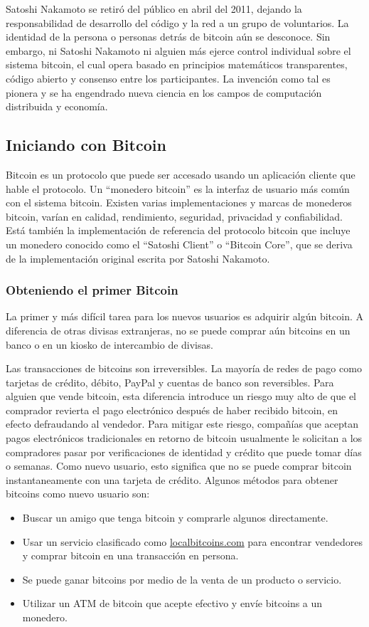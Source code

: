 \documentclass[10pt,journal,compsoc]{IEEEtran}
\begin{document}
Satoshi Nakamoto se retiró del público en abril del 2011, dejando la responsabilidad de desarrollo del código y la red a un grupo de voluntarios. La identidad de la persona o personas detrás de bitcoin aún se desconoce. Sin embargo, ni Satoshi Nakamoto ni alguien más ejerce control individual sobre el sistema bitcoin, el cual opera basado en principios matemáticos transparentes, código abierto y consenso entre los participantes. La invención como tal es pionera y se ha engendrado nueva ciencia en los campos de computación distribuida y economía. 

\subsection{Iniciando con Bitcoin}
Bitcoin es un protocolo que puede ser accesado usando un aplicación cliente que hable el protocolo. Un ``monedero bitcoin'' es la interfaz de usuario más común con el sistema bitcoin. Existen varias implementaciones y marcas de monederos bitcoin, varían en calidad, rendimiento, seguridad, privacidad y confiabilidad. Está también la implementación de referencia del protocolo bitcoin que incluye un monedero conocido como el ``Satoshi Client'' o ``Bitcoin Core'', que se deriva de la implementación original escrita por Satoshi Nakamoto.

\subsubsection{Obteniendo el primer Bitcoin}
La primer y más difícil tarea para los nuevos usuarios es adquirir algún bitcoin. A diferencia de otras divisas extranjeras, no se puede comprar aún bitcoins en un banco o en un kiosko de intercambio de divisas.

Las transacciones de bitcoins son irreversibles. La mayoría de redes de pago como tarjetas de crédito, débito, PayPal y cuentas de banco son reversibles. Para alguien que vende bitcoin, esta diferencia introduce un riesgo muy alto de que el comprador revierta el pago electrónico después de haber recibido bitcoin, en efecto defraudando al vendedor. Para mitigar este riesgo, compañías que aceptan pagos electrónicos tradicionales en retorno de bitcoin usualmente le solicitan a los compradores pasar por verificaciones de identidad y crédito que puede tomar días o semanas. Como nuevo usuario, esto significa que no se puede comprar bitcoin instantaneamente con una tarjeta de crédito. Algunos métodos para obtener bitcoins como nuevo usuario son:
\begin{itemize}
    \item Buscar un amigo que tenga bitcoin y comprarle algunos directamente.
    \item Usar un servicio clasificado como \url{localbitcoins.com} para encontrar vendedores y comprar bitcoin en una transacción en persona.
    \item Se puede ganar bitcoins por medio de la venta de un producto o servicio.
    \item Utilizar un ATM de bitcoin que acepte efectivo y envíe bitcoins a un monedero. 
\end{itemize}
\end{document}
